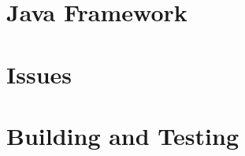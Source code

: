 \section{Java Framework}
\label{sec:java-frmwrk-multi-user}


\section{Issues}
\label{sec:issues-multi-user}


\section{Building and Testing}
\label{sec:build-test-multi-user}


